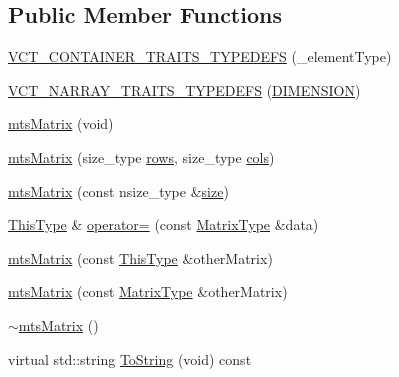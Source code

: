 \subsection*{Public Member Functions}
\begin{DoxyCompactItemize}
\item 
\hyperlink{classmts_matrix_a05a9dba88445c911845d9d506d8ecd6a}{V\+C\+T\+\_\+\+C\+O\+N\+T\+A\+I\+N\+E\+R\+\_\+\+T\+R\+A\+I\+T\+S\+\_\+\+T\+Y\+P\+E\+D\+E\+F\+S} (\+\_\+element\+Type)
\item 
\hyperlink{classmts_matrix_a14f876cfd90b0b87c5e3d2df7035061e}{V\+C\+T\+\_\+\+N\+A\+R\+R\+A\+Y\+\_\+\+T\+R\+A\+I\+T\+S\+\_\+\+T\+Y\+P\+E\+D\+E\+F\+S} (\hyperlink{classmts_matrix_ae82a0a7b77148177bfd8988bbdda882aa6aacbb86e5a9e8a2865163a7182717de}{D\+I\+M\+E\+N\+S\+I\+O\+N})
\item 
\hyperlink{classmts_matrix_ac9cad72e00bd8c2b19aea2b7559532e5}{mts\+Matrix} (void)
\item 
\hyperlink{classmts_matrix_a276c20a3bd53e9a3e0cdb9abaf6636e2}{mts\+Matrix} (size\+\_\+type \hyperlink{classvct_dynamic_const_matrix_base_a5eac13be2207ebeb8766cde379d73438}{rows}, size\+\_\+type \hyperlink{classvct_dynamic_const_matrix_base_aa6c51d41a100da49a7e7ac7edb20ecd9}{cols})
\item 
\hyperlink{classmts_matrix_a2a8541b2558c067d47018cea68dba8a3}{mts\+Matrix} (const nsize\+\_\+type \&\hyperlink{classvct_dynamic_const_matrix_base_ab9d484f83471aee6512ea614aa54bd0b}{size})
\item 
\hyperlink{classvct_dynamic_const_matrix_base_ac4ff48cbe4d9de3fdef5a02447ffb9db}{This\+Type} \& \hyperlink{classmts_matrix_a5f1bbdf2ee3d0c9be6ecc30115f3e461}{operator=} (const \hyperlink{classmts_matrix_af0f57fd565d954a7485dcb26a384d64a}{Matrix\+Type} \&data)
\item 
\hyperlink{classmts_matrix_af147e5f3289b076ba9d8ef120a4f8c08}{mts\+Matrix} (const \hyperlink{classvct_dynamic_const_matrix_base_ac4ff48cbe4d9de3fdef5a02447ffb9db}{This\+Type} \&other\+Matrix)
\item 
\hyperlink{classmts_matrix_a6db0506bfc1dffb488508c4d86afa934}{mts\+Matrix} (const \hyperlink{classmts_matrix_af0f57fd565d954a7485dcb26a384d64a}{Matrix\+Type} \&other\+Matrix)
\item 
\hyperlink{classmts_matrix_ae546daa42fa4de05f058b0920bcde8fa}{$\sim$mts\+Matrix} ()
\item 
virtual std\+::string \hyperlink{classmts_matrix_a87c946054830a85e05c76c8599759725}{To\+String} (void) const 
\item 

\end{DoxyCompactItemize}
